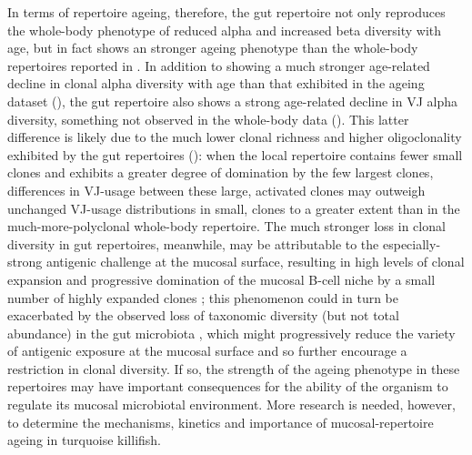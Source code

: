 In terms of repertoire ageing, therefore, the gut repertoire not only reproduces the whole-body phenotype of reduced alpha and increased beta diversity with age, but in fact shows an stronger ageing phenotype than the whole-body repertoires reported in . In addition to showing a much stronger age-related decline in clonal alpha diversity with age than that exhibited in the ageing dataset (), the gut repertoire also shows a strong age-related decline in VJ alpha diversity, something not observed in the whole-body data (). This latter difference is likely due to the much lower clonal richness and higher oligoclonality exhibited by the gut repertoires (): when the local repertoire contains fewer small \naive clones and exhibits a greater degree of domination by the few largest clones, differences in VJ-usage between these large, activated clones may outweigh unchanged VJ-usage distributions in small, \naive clones to a greater extent than in the much-more-polyclonal whole-body repertoire. The much stronger loss in clonal diversity in gut repertoires, meanwhile, may be attributable to the especially-strong antigenic challenge at the mucosal surface, resulting in high levels of clonal expansion and progressive domination of the mucosal B-cell niche by a small number of highly expanded clones \parencite{caruso2009immunosenescence}; this phenomenon could in turn be exacerbated by the observed loss of taxonomic diversity (but not total abundance) in the gut microbiota \parencite{smith2017microbiota}, which might progressively reduce the variety of antigenic exposure at the mucosal surface and so further encourage a restriction in clonal diversity. If so, the strength of the ageing phenotype in these repertoires may have important consequences for the ability of the organism to regulate its mucosal microbiotal environment. More research is needed, however, to determine the mechanisms, kinetics and importance of mucosal-repertoire ageing in turquoise killifish.


